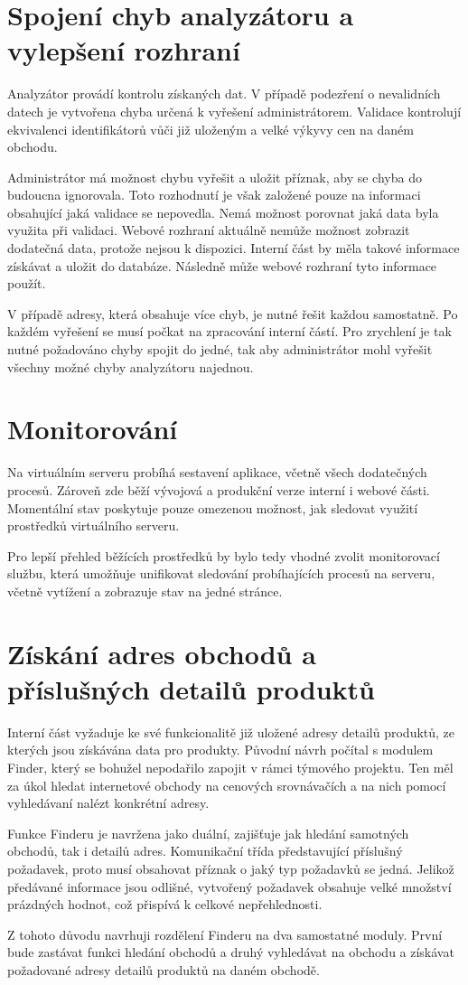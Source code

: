 \documentclass[thesis=B,czech]{FITthesis}[2012/06/26]
\begin{document}
\section{Spojení chyb analyzátoru a vylepšení rozhraní} \label{analyser-join}
Analyzátor provádí kontrolu získaných dat. V případě podezření o nevalidních datech je vytvořena chyba určená k vyřešení
administrátorem. Validace kontrolují ekvivalenci identifikátorů vůči již uloženým a velké výkyvy cen na daném obchodu.
\par
Administrátor má možnost chybu vyřešit a uložit příznak, aby se chyba do budoucna ignorovala. Toto rozhodnutí je však
založené pouze na informaci obsahující jaká validace se nepovedla. Nemá možnost porovnat jaká data byla využita při validaci.
Webové rozhraní aktuálně nemůže možnost zobrazit dodatečná data, protože nejsou k dispozici. Interní část by měla takové informace
získávat a uložit do databáze. Následně může webové rozhraní tyto informace použít.
\par
V případě adresy, která obsahuje více chyb, je nutné řešit každou samostatně. Po každém vyřešení se musí počkat na zpracování interní částí.
Pro zrychlení je tak nutné požadováno chyby spojit do jedné, tak aby administrátor mohl vyřešit všechny možné chyby analyzátoru najednou.

\section{Monitorování}
Na virtuálním serveru probíhá sestavení aplikace, včetně všech dodatečných procesů. Zároveň zde běží vývojová a produkční verze interní i webové části.
Momentální stav poskytuje pouze omezenou možnost, jak sledovat využití prostředků virtuálního serveru.
\par
Pro lepší přehled běžících prostředků by bylo tedy vhodné zvolit monitorovací službu, která umožňuje unifikovat sledování
probíhajících procesů na serveru, včetně vytížení a zobrazuje stav na jedné stránce.

\section{Získání adres obchodů a příslušných detailů produktů}
Interní část vyžaduje ke své funkcionalitě již uložené adresy detailů produktů, ze kterých jsou získávána data pro produkty.
Původní návrh počítal s modulem Finder, který se bohužel nepodařilo zapojit v rámci týmového projektu. Ten 
měl za úkol hledat internetové obchody na cenových srovnávačích a na nich pomocí vyhledávaní nalézt konkrétní adresy.
\par
Funkce Finderu je navržena jako duální, zajišťuje jak hledání samotných obchodů, tak i detailů adres. Komunikační třída představující příslušný požadavek, proto musí obsahovat příznak o jaký typ požadavků se jedná. Jelikož předávané informace
jsou odlišné, vytvořený požadavek obsahuje velké množství prázdných hodnot, což přispívá k celkové nepřehlednosti.
\par
Z tohoto důvodu navrhuji rozdělení Finderu na dva samostatné moduly. První bude zastávat funkci hledání obchodů a druhý
vyhledávat na obchodu a získávat požadované adresy detailů produktů na daném obchodě.
\end{document}

